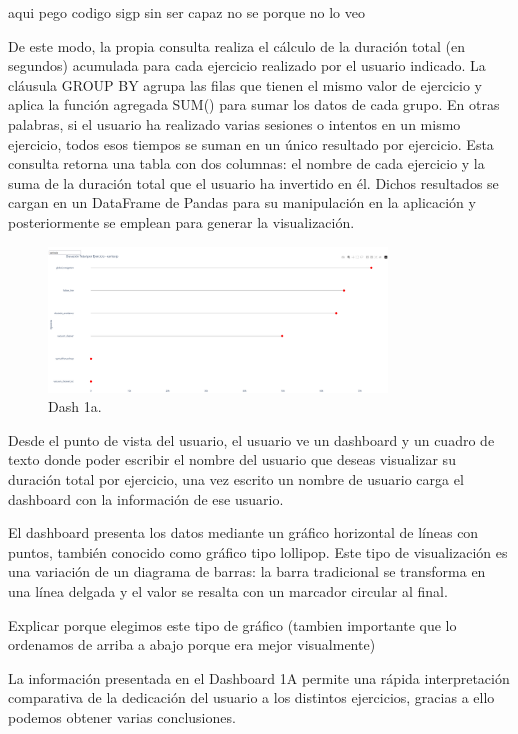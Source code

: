 \documentclass[a4paper, 12pt]{book}
\begin{document}
aqui pego codigo sigp sin ser capaz no se porque no lo veo

De este modo, la propia consulta realiza el cálculo de la duración total (en segundos) acumulada para cada ejercicio realizado por el usuario indicado. La cláusula GROUP BY agrupa las filas que tienen el mismo valor de ejercicio y aplica la función agregada SUM() para sumar los datos de cada grupo.
En otras palabras, si el usuario ha realizado varias sesiones o intentos en un mismo ejercicio, todos esos tiempos se suman en un único resultado por ejercicio. Esta consulta retorna una tabla con dos columnas: el nombre de cada ejercicio y la suma de la duración total que el usuario ha invertido en él. Dichos resultados se cargan en un DataFrame de Pandas para su manipulación en la aplicación y posteriormente se emplean para generar la visualización.

\begin{figure}
  \centering
  \includegraphics[width=9cm, keepaspectratio]{img/1a.png}
  \caption{Dash 1a.}\label{fig:1a}
\end{figure}

Desde el punto de vista del usuario, el usuario ve un dashboard y un cuadro de texto donde poder escribir el nombre del usuario que deseas visualizar su duración total por ejercicio, una vez escrito un nombre de usuario carga el dashboard con la información de ese usuario.

El dashboard presenta los datos mediante un gráfico horizontal de líneas con puntos, también conocido como gráfico tipo lollipop. Este tipo de visualización es una variación de un diagrama de barras: la barra tradicional se transforma en una línea delgada y el valor se resalta con un marcador circular al final.

Explicar porque elegimos este tipo de gráfico (tambien importante que lo ordenamos de arriba a abajo porque era mejor visualmente)

La información presentada en el Dashboard 1A permite una rápida interpretación comparativa de la dedicación del usuario a los distintos ejercicios, gracias a ello podemos obtener varias conclusiones.
\end{document}
